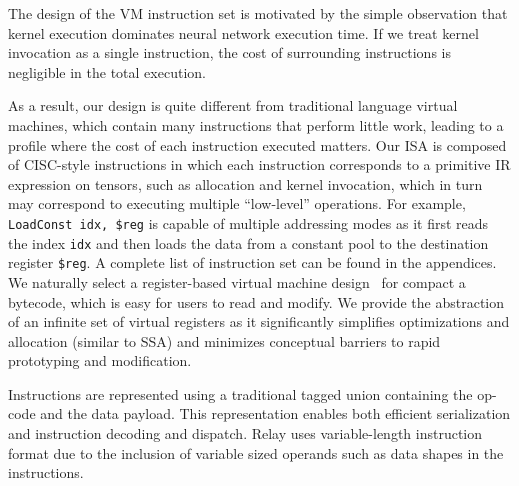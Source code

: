 The design of the VM instruction set is motivated by the simple observation that kernel execution dominates neural network execution time. If we treat kernel invocation as a single instruction, the cost of surrounding instructions is negligible in the total execution.

As a result, our design is quite different from traditional language virtual machines, which contain many instructions that perform little work, leading to a profile where the cost of each instruction executed matters.
Our ISA is composed of CISC-style instructions in which each instruction corresponds to a primitive IR expression on tensors, such as allocation and kernel invocation, which in turn may correspond to executing multiple ``low-level'' operations. For example, \texttt{LoadConst idx, \$reg} is capable of multiple addressing modes as it first reads the index \texttt{idx} and then loads the data from a constant pool to the destination register \texttt{\$reg}.
A complete list of instruction set can be found in the appendices.
We naturally select a register-based virtual machine design~\citep{davis2003case} for compact a bytecode, which is easy for users to read and modify. We provide the abstraction of an infinite set of virtual registers as it significantly simplifies optimizations and allocation (similar to SSA) and minimizes conceptual barriers to rapid prototyping and modification.

Instructions are represented using a traditional tagged union containing the op-code and the data payload. This representation enables both efficient serialization and instruction decoding and dispatch. Relay uses variable-length instruction format due to the inclusion of variable sized operands such as data shapes in the instructions.




